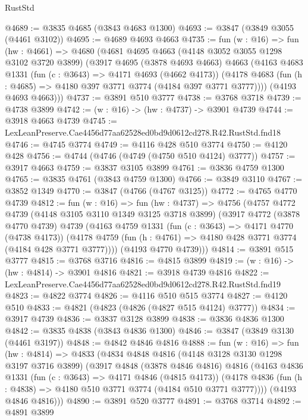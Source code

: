 \begin{lexlean}{RustStd}
\begin{coremodule}
@4689 := @3835 @4685 (@3843 @4683 @1300)
@4693 := @3847 (@3849 @3055 (@4461 @3102))
@4695 := @4689 @4693 @4663
@4735 := fun (w : @16) =>
  fun (hw : @4661) =>
  @4680
    (@4681
      @4695
      @4663
      (@4148 @3052 @3055 @1298 @3102 @3720 @3899)
      (@3917
        @4695
        (@3878 @4693 @4663)
        @4663
        (@4163
          @4683
          @1331
          (fun (c : @3643) => @4171 @4693 (@4662 @4173))
          (@4178 @4683 (fun (h : @4685) => @4180 @397 @3771 @3774 (@4184 @397 @3771 @3777))))
        (@4193 @4693 @4663)))
@4737 := @3891 @510 @3777
@4738 := @3768 @3718
@4739 := @4738 @3899
@4742 := (w : @16) -> (hw : @4737) -> @3901 @4739
@4744 := @3918 @4663 @4739
@4745 := LexLeanPreserve.Cae4456d77aa62528ed0bd9d0612cd278.R42.RustStd.fnd18
@4746 := @4745 @3774
@4749 := @4116 @428 @510 @3774
@4750 := @4120 @428
@4756 := @4744 (@4746 (@4749 (@4750 @510 @4124) @3777))
@4757 := @3917 @4663
@4759 := @3837 @3105 @3899
@4761 := @3836 @4759 @1300
@4765 := @3835 @4761 (@3843 @4759 @1300)
@4766 := @3849 @3110
@4767 := @3852 @1349
@4770 := @3847 (@4766 (@4767 @3125))
@4772 := @4765 @4770 @4739
@4812 := fun (w : @16) =>
  fun (hw : @4737) =>
  @4756
    (@4757
      @4772
      @4739
      (@4148 @3105 @3110 @1349 @3125 @3718 @3899)
      (@3917
        @4772
        (@3878 @4770 @4739)
        @4739
        (@4163
          @4759
          @1331
          (fun (c : @3643) => @4171 @4770 (@4738 @4173))
          (@4178 @4759 (fun (h : @4761) => @4180 @428 @3771 @3774 (@4184 @428 @3771 @3777))))
        (@4193 @4770 @4739)))
@4814 := @3891 @515 @3777
@4815 := @3768 @3716
@4816 := @4815 @3899
@4819 := (w : @16) -> (hw : @4814) -> @3901 @4816
@4821 := @3918 @4739 @4816
@4822 := LexLeanPreserve.Cae4456d77aa62528ed0bd9d0612cd278.R42.RustStd.fnd19
@4823 := @4822 @3774
@4826 := @4116 @510 @515 @3774
@4827 := @4120 @510
@4833 := @4821 (@4823 (@4826 (@4827 @515 @4124) @3777))
@4834 := @3917 @4739
@4836 := @3837 @3128 @3899
@4838 := @3836 @4836 @1300
@4842 := @3835 @4838 (@3843 @4836 @1300)
@4846 := @3847 (@3849 @3130 (@4461 @3197))
@4848 := @4842 @4846 @4816
@4888 := fun (w : @16) =>
  fun (hw : @4814) =>
  @4833
    (@4834
      @4848
      @4816
      (@4148 @3128 @3130 @1298 @3197 @3716 @3899)
      (@3917
        @4848
        (@3878 @4846 @4816)
        @4816
        (@4163
          @4836
          @1331
          (fun (c : @3643) => @4171 @4846 (@4815 @4173))
          (@4178 @4836 (fun (h : @4838) => @4180 @510 @3771 @3774 (@4184 @510 @3771 @3777))))
        (@4193 @4846 @4816)))
@4890 := @3891 @520 @3777
@4891 := @3768 @3714
@4892 := @4891 @3899

\end{coremodule}
\end{lexlean}
